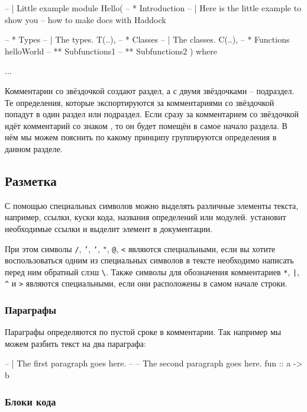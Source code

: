 \begin{code}
-- | Little example
module Hello(
    -- * Introduction
    -- | Here is the little example to show you
    -- how to make docs with Haddock
    
    -- * Types
    -- | The types.
    T(..),
    -- * Classes
    -- | The classes.
    C(..),
    -- * Functions
    helloWorld
    -- ** Subfunctions1
    -- ** Subfunctions2    
) where

...
\end{code}

Комментарии со звёздочкой создают раздел, а с двумя 
звёздочками -- подраздел. Те определения, которые 
экспортируются за комментариями со звёздочкой попадут в 
один раздел или подраздел. Если сразу за комментарием со 
звёздочкой идёт комментарий со знаком , то
он будет помещён в самое начало раздела. В нём мы можем 
пояснить по какому принципу группируются определения
в данном разделе.

\subsection{Разметка}

С помощью специальных символов можно выделять различные 
элементы текста, например, ссылки, куски кода, названия
определений или модулей.  установит 
необходимые ссылки и выделит элемент в документации.

При этом символы \texttt{/}, \texttt{'}, \texttt{`}, \texttt{"},
\texttt{@}, \texttt{<} являются специальными, если вы хотите воспользоваться
одним из специальных символов в тексте необходимо написать перед ним
обратный слэш \verb!\!. Также символы для обозначения
комментариев \texttt{*}, \texttt{|}, \texttt{\^} и \texttt{>}  являются специальными,
если они расположены в самом начале строки.


\subsubsection{Параграфы}

Параграфы определяются по пустой сроке в комментарии.
Так например мы можем разбить текст на два параграфа:

\begin{code}
-- | The first paragraph goes here.
--
-- The second paragraph goes here.
fun :: a -> b
\end{code}

\subsubsection{Блоки кода}

